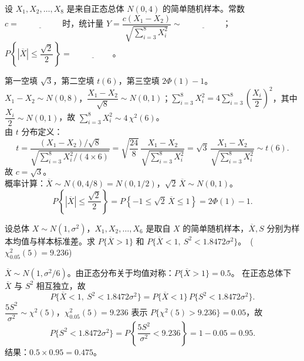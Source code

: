 \documentclass[lang=cn,11pt]{elegantbook}
\begin{document}
\begin{exercise}\label{exer:6-t-prob}
设 \(X_1, X_2, \dots, X_8\) 是来自正态总体 \(N(0, 4)\) 的简单随机样本。常数 \(c =\,\underline{\hspace{2cm}}\) 时，统计量 \(Y = \dfrac{c(X_1-X_2)}{\sqrt{\sum_{i=3}^{8}X_i^2}} \sim\,\underline{\hspace{2cm}}\)；\(P\!\left\{|\overline{X}| \leq \dfrac{\sqrt{2}}{2}\right\} =\,\underline{\hspace{2cm}}\)。
\end{exercise}
\begin{solution}
第一空填 \(\sqrt{3}\)，第二空填 \(t(6)\)，第三空填 \(2\Phi(1)-1\)。\\
\(X_1-X_2 \sim N(0, 8)\)，\(\dfrac{X_1-X_2}{\sqrt{8}} \sim N(0,1)\)；\(\sum_{i=3}^{8}X_i^2 = 4\sum_{i=3}^{8}\!\left(\dfrac{X_i}{2}\right)^{\!2}\)，其中 \(\dfrac{X_i}{2} \sim N(0,1)\)，故 \(\sum_{i=3}^{8}X_i^2 \sim 4\,\chi^2(6)\)。\\
由 \(t\) 分布定义：
\[
t = \frac{(X_1-X_2)/\sqrt{8}}{\sqrt{\sum_{i=3}^{8}X_i^2/(4 \times 6)}} = \sqrt{\frac{24}{8}}\,\frac{X_1-X_2}{\sqrt{\sum_{i=3}^{8}X_i^2}} = \sqrt{3}\,\frac{X_1-X_2}{\sqrt{\sum_{i=3}^{8}X_i^2}} \sim t(6).
\]
故 \(c = \sqrt{3}\)。\\
概率计算：\(\overline{X} \sim N(0, 4/8) = N(0, 1/2)\)，\(\sqrt{2}\,\overline{X} \sim N(0,1)\)。
\[
P\!\left\{|\overline{X}| \leq \frac{\sqrt{2}}{2}\right\} = P\!\left\{-1 \leq \sqrt{2}\,\overline{X} \leq 1\right\} = 2\Phi(1)-1.
\]
\end{solution}

\begin{exercise}\label{exer:6-xbar-s2-prob}
设总体 \(X \sim N(1, \sigma^2)\)，\(X_1, X_2, \dots, X_6\) 是取自 \(X\) 的简单随机样本，\(\overline{X}, S\) 分别为样本均值与样本标准差。求 \(P\{\overline{X} > 1\}\) 和 \(P\{\overline{X} < 1,\ S^2 < 1.8472\sigma^2\}\)。\ (\(\chi^2_{0.05}(5) = 9.236\))
\end{exercise}
\begin{solution}
\(\overline{X} \sim N(1, \sigma^2/6)\)。由正态分布关于均值对称：\(P\{\overline{X} > 1\} = 0.5\)。
在正态总体下 \(\overline{X}\) 与 \(S^2\) 相互独立，故
\[
P\{\overline{X} < 1,\ S^2 < 1.8472\sigma^2\} = P\{\overline{X} < 1\}\,P\{S^2 < 1.8472\sigma^2\}.
\]
\(\dfrac{5S^2}{\sigma^2} \sim \chi^2(5)\)，\(\chi^2_{0.05}(5) = 9.236\) 表示 \(P\{\chi^2(5) > 9.236\} = 0.05\)，故
\[
P\{S^2 < 1.8472\sigma^2\} = P\!\left\{\frac{5S^2}{\sigma^2} < 9.236\right\} = 1 - 0.05 = 0.95.
\]
结果：\(0.5 \times 0.95 = 0.475\)。
\end{solution}
\end{document}
